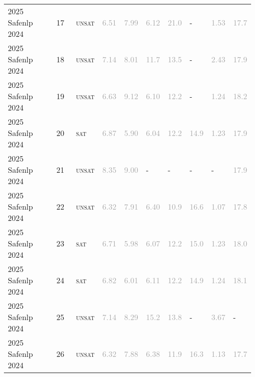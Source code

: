 \begin{center}
{\begin{longtable}{@{}llllllllll@{}}
2025 Safenlp 2024 & 17 & ~\textsc{unsat} & \textcolor{darkgray}{6.51} & \textcolor{darkgray}{7.99} & \textcolor{darkgray}{6.12} & \textcolor{darkgray}{21.0} & - & \textcolor{darkgray}{1.53} & \textcolor{darkgray}{17.7} \\
2025 Safenlp 2024 & 18 & ~\textsc{unsat} & \textcolor{darkgray}{7.14} & \textcolor{darkgray}{8.01} & \textcolor{darkgray}{11.7} & \textcolor{darkgray}{13.5} & - & \textcolor{darkgray}{2.43} & \textcolor{darkgray}{17.9} \\
2025 Safenlp 2024 & 19 & ~\textsc{unsat} & \textcolor{darkgray}{6.63} & \textcolor{darkgray}{9.12} & \textcolor{darkgray}{6.10} & \textcolor{darkgray}{12.2} & - & \textcolor{darkgray}{1.24} & \textcolor{darkgray}{18.2} \\
2025 Safenlp 2024 & 20 & ~\textsc{sat} & \textcolor{darkgray}{6.87} & \textcolor{darkgray}{5.90} & \textcolor{darkgray}{6.04} & \textcolor{darkgray}{12.2} & \textcolor{darkgray}{14.9} & \textcolor{darkgray}{1.23} & \textcolor{darkgray}{17.9} \\
2025 Safenlp 2024 & 21 & ~\textsc{unsat} & \textcolor{darkgray}{8.35} & \textcolor{darkgray}{9.00} & - & - & - & - & \textcolor{darkgray}{17.9} \\
2025 Safenlp 2024 & 22 & ~\textsc{unsat} & \textcolor{darkgray}{6.32} & \textcolor{darkgray}{7.91} & \textcolor{darkgray}{6.40} & \textcolor{darkgray}{10.9} & \textcolor{darkgray}{16.6} & \textcolor{darkgray}{1.07} & \textcolor{darkgray}{17.8} \\
2025 Safenlp 2024 & 23 & ~\textsc{sat} & \textcolor{darkgray}{6.71} & \textcolor{darkgray}{5.98} & \textcolor{darkgray}{6.07} & \textcolor{darkgray}{12.2} & \textcolor{darkgray}{15.0} & \textcolor{darkgray}{1.23} & \textcolor{darkgray}{18.0} \\
2025 Safenlp 2024 & 24 & ~\textsc{sat} & \textcolor{darkgray}{6.82} & \textcolor{darkgray}{6.01} & \textcolor{darkgray}{6.11} & \textcolor{darkgray}{12.2} & \textcolor{darkgray}{14.9} & \textcolor{darkgray}{1.24} & \textcolor{darkgray}{18.1} \\
2025 Safenlp 2024 & 25 & ~\textsc{unsat} & \textcolor{darkgray}{7.14} & \textcolor{darkgray}{8.29} & \textcolor{darkgray}{15.2} & \textcolor{darkgray}{13.8} & - & \textcolor{darkgray}{3.67} & - \\
2025 Safenlp 2024 & 26 & ~\textsc{unsat} & \textcolor{darkgray}{6.32} & \textcolor{darkgray}{7.88} & \textcolor{darkgray}{6.38} & \textcolor{darkgray}{11.9} & \textcolor{darkgray}{16.3} & \textcolor{darkgray}{1.13} & \textcolor{darkgray}{17.7} \\

\end{longtable}}
\end{center}
